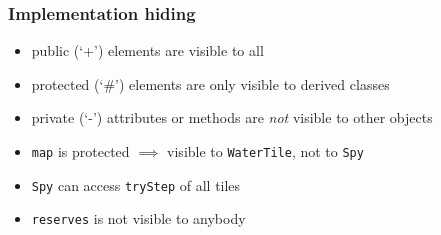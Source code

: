 \documentclass{slides}
\begin{document}
\begin{frame}
  \frametitle{Implementation hiding}
  \begin{center}
  \end{center}

  \begin{itemize}
  \item \alert{public} (`+') elements are visible to all
  \item \alert{protected} (`\#') elements are only visible to derived classes
  \item \alert{private} (`-') attributes or methods are \emph{not} visible to
    other objects
  \item \lstinline[style=inline]!map! is protected $\implies$ visible to
    \lstinline[style=inline]!WaterTile!, not to \lstinline[style=inline]!Spy!
  \item \lstinline[style=inline]!Spy! can access \lstinline[style=inline]!tryStep! of all tiles
  \item \lstinline[style=inline]!reserves! is not visible to anybody
  \end{itemize}
\end{frame}
\end{document}
